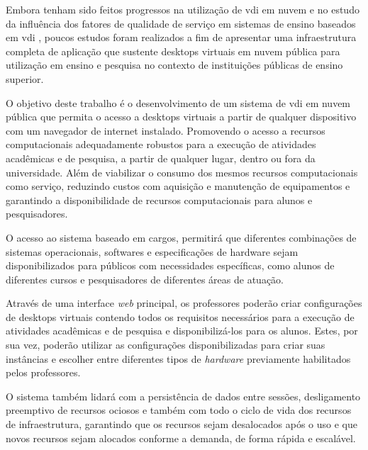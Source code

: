 Embora tenham sido feitos progressos na utilização de \gls{vdi} em nuvem e no estudo da influência dos fatores de qualidade de serviço em sistemas de ensino baseados em \gls{vdi} \citep{qoselearning}, poucos estudos foram realizados a fim de apresentar uma infraestrutura completa de aplicação que sustente \glspl{desktop} virtuais em nuvem pública para utilização em ensino e pesquisa no contexto de instituições públicas de ensino superior.

O objetivo deste trabalho é o desenvolvimento de um sistema de \gls{vdi} em nuvem pública que permita o acesso a \glspl{desktop} virtuais a partir de qualquer dispositivo com um navegador de internet instalado. Promovendo o acesso a recursos computacionais adequadamente robustos para a execução de atividades acadêmicas e de pesquisa, a partir de qualquer lugar, dentro ou fora da universidade. Além de viabilizar o consumo dos mesmos recursos computacionais como serviço, reduzindo custos com aquisição e manutenção de equipamentos e garantindo a disponibilidade de recursos computacionais para alunos e pesquisadores.

O acesso ao sistema baseado em cargos, permitirá que diferentes combinações de sistemas operacionais, softwares e especificações de hardware sejam disponibilizados para públicos com necessidades específicas, como alunos de diferentes cursos e pesquisadores de diferentes áreas de atuação.

Através de uma interface \textit{web} principal, os professores poderão criar configurações de \glspl{desktop} virtuais contendo todos os requisitos necessários para a execução de atividades acadêmicas e de pesquisa e disponibilizá-los para os alunos. Estes, por sua vez, poderão utilizar as configurações disponibilizadas para criar suas instâncias e escolher entre diferentes tipos de \textit{hardware} previamente habilitados pelos professores.

O sistema também lidará com a persistência de dados entre sessões, desligamento preemptivo de recursos ociosos e também com todo o ciclo de vida dos recursos de infraestrutura, garantindo que os recursos sejam desalocados após o uso e que novos recursos sejam alocados conforme a demanda, de forma rápida e escalável.



